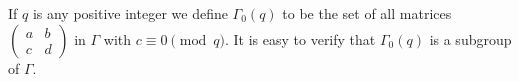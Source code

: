 If $q$ is any positive integer we define $\Gamma_0(q)$ to be the set of all matrices $\begin{pmatrix} a & b \\ c & d \end{pmatrix}$ in $\Gamma$ with $c \equiv 0 \pmod{q}$. It is easy to verify that $\Gamma_0(q)$ is a subgroup of $\Gamma$.
